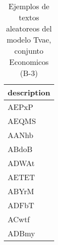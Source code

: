 \begin{table}[H]
\centering
\fontsize{8}{14}\selectfont
\caption{Ejemplos de textos aleatoreos del modelo Tvae, conjunto Economicos (B-3)}
\label{table-sample10-economicos-b-3-tvae-text}
\begin{tabular}{|m{50em}|}
\hline
\rowcolor[gray]{0.8}
description \\
\hline AEPxP \\
\hline AEQMS \\
\hline AANhb \\
\hline ABdoB \\
\hline ADWAt \\
\hline AETET \\
\hline ABYrM \\
\hline ADFbT \\
\hline ACwtf \\
\hline ADBmy \\
\hline
\end{tabular}
\end{table}
